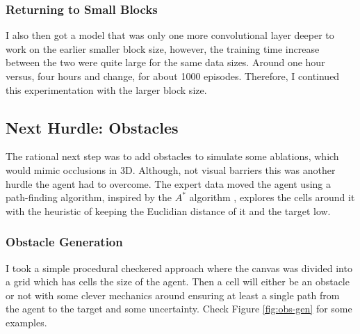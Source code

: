 \subsubsection{Returning to Small Blocks}
I also then got a model that was only one more convolutional layer deeper to work on the earlier smaller block size, however, the training time increase between the two were quite large for the same data sizes. Around one hour versus, four hours and change, for about 1000 episodes. Therefore, I continued this experimentation with the larger block size.


\subsection{Next Hurdle: Obstacles}
The rational next step was to add obstacles to simulate some ablations, which would mimic occlusions in 3D. Although, not visual barriers this was another hurdle the agent had to overcome.
The expert data moved the agent using a path-finding algorithm, inspired by the $A^*$ algorithm \cite{cui2011based}, explores the cells around it with the heuristic of keeping the Euclidian distance of it and the target low. 

\subsubsection{Obstacle Generation}
I took a simple procedural checkered approach where the canvas was divided into a grid which has cells the size of the agent. Then a cell will either be an obstacle or not with some clever mechanics around ensuring at least a single path from the agent to the target and some uncertainty. Check Figure \ref{fig:obs-gen} for some examples.

